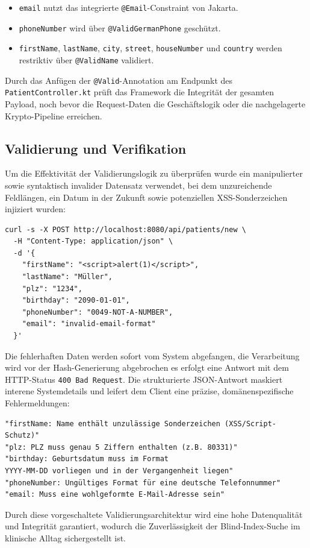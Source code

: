 \begin{itemize}
    \begin{itemize}
        \item \texttt{email} nutzt das integrierte \texttt{@Email}-Constraint von Jakarta.
        \item \texttt{phoneNumber} wird über \texttt{@ValidGermanPhone} geschützt.
        \item \texttt{firstName}, \texttt{lastName}, \texttt{city}, \texttt{street}, \texttt{houseNumber} und \texttt{country} werden 
        restriktiv über \texttt{@ValidName} validiert.
    \end{itemize}
    Durch das Anfügen der \texttt{@Valid}-Annotation am Endpunkt des \texttt{PatientController.kt} prüft das Framework die Integrität der gesamten Payload, 
    noch bevor die Request-Daten die Geschäftslogik oder die nachgelagerte Krypto-Pipeline erreichen.
\end{itemize}

\subsection{Validierung und Verifikation}

Um die Effektivität der Validierungslogik zu überprüfen wurde ein manipulierter sowie syntaktisch invalider Datensatz verwendet, bei dem unzureichende 
Feldlängen, ein Datum in der Zukunft sowie potenziellen XSS-Sonderzeichen injiziert wurden:

\begin{verbatim}
curl -s -X POST http://localhost:8080/api/patients/new \
  -H "Content-Type: application/json" \
  -d '{
    "firstName": "<script>alert(1)</script>",
    "lastName": "Müller",
    "plz": "1234",
    "birthday": "2090-01-01",
    "phoneNumber": "0049-NOT-A-NUMBER",
    "email": "invalid-email-format"
  }'
\end{verbatim}

Die fehlerhaften Daten werden sofort vom System abgefangen, die Verarbeitung wird vor der Hash-Generierung abgebrochen es erfolgt eine Antwort mit dem
HTTP-Status \texttt{400 Bad Request}. Die strukturierte JSON-Antwort maskiert interene Systemdetails und leifert dem Client eine präzise,
domänenspezifische Fehlermeldungen: 

\begin{verbatim}
"firstName: Name enthält unzulässige Sonderzeichen (XSS/Script-Schutz)"
"plz: PLZ muss genau 5 Ziffern enthalten (z.B. 80331)"
"birthday: Geburtsdatum muss im Format 
YYYY-MM-DD vorliegen und in der Vergangenheit liegen"
"phoneNumber: Ungültiges Format für eine deutsche Telefonnummer"
"email: Muss eine wohlgeformte E-Mail-Adresse sein"
\end{verbatim}

Durch diese vorgeschaltete Validierungsarchitektur wird eine hohe Datenqualität und Integrität garantiert, wodurch die Zuverlässigkeit der Blind-Index-Suche 
im klinische Alltag sichergestellt ist.
